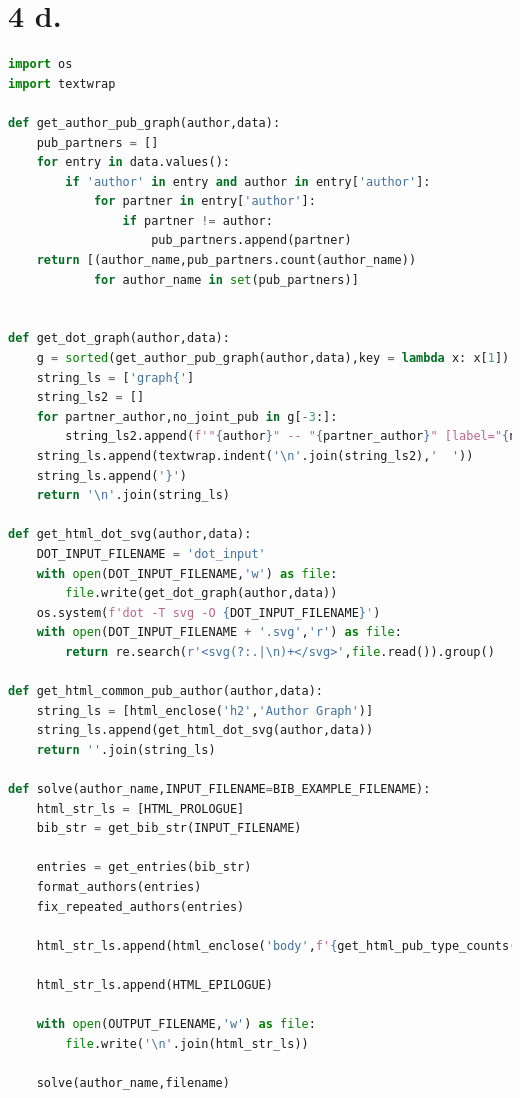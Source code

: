 \documentclass[11pt,a4paper]{report}
\begin{document}
\section{4 d.}
\begin{lstlisting}[language=python]
import os
import textwrap

def get_author_pub_graph(author,data):
    pub_partners = []
    for entry in data.values():
        if 'author' in entry and author in entry['author']:
            for partner in entry['author']:
                if partner != author:
                    pub_partners.append(partner)
    return [(author_name,pub_partners.count(author_name))
            for author_name in set(pub_partners)]


def get_dot_graph(author,data):
    g = sorted(get_author_pub_graph(author,data),key = lambda x: x[1])
    string_ls = ['graph{']
    string_ls2 = []
    for partner_author,no_joint_pub in g[-3:]:
        string_ls2.append(f'"{author}" -- "{partner_author}" [label="{no_joint_pub}"]')
    string_ls.append(textwrap.indent('\n'.join(string_ls2),'  '))
    string_ls.append('}')
    return '\n'.join(string_ls)

def get_html_dot_svg(author,data):
    DOT_INPUT_FILENAME = 'dot_input'
    with open(DOT_INPUT_FILENAME,'w') as file:
        file.write(get_dot_graph(author,data))
    os.system(f'dot -T svg -O {DOT_INPUT_FILENAME}')
    with open(DOT_INPUT_FILENAME + '.svg','r') as file:
        return re.search(r'<svg(?:.|\n)+</svg>',file.read()).group()

def get_html_common_pub_author(author,data):
    string_ls = [html_enclose('h2','Author Graph')]
    string_ls.append(get_html_dot_svg(author,data))
    return ''.join(string_ls)

def solve(author_name,INPUT_FILENAME=BIB_EXAMPLE_FILENAME):
    html_str_ls = [HTML_PROLOGUE]
    bib_str = get_bib_str(INPUT_FILENAME)

    entries = get_entries(bib_str)
    format_authors(entries)
    fix_repeated_authors(entries)

    html_str_ls.append(html_enclose('body',f'{get_html_pub_type_counts(entries)}{get_html_common_pub_author(author_name,entries)}{get_html_pub_type_index(entries)}{get_html_author_index(entries)}'))

    html_str_ls.append(HTML_EPILOGUE)

    with open(OUTPUT_FILENAME,'w') as file:
        file.write('\n'.join(html_str_ls))

    solve(author_name,filename)

\end{lstlisting}
\end{document}
